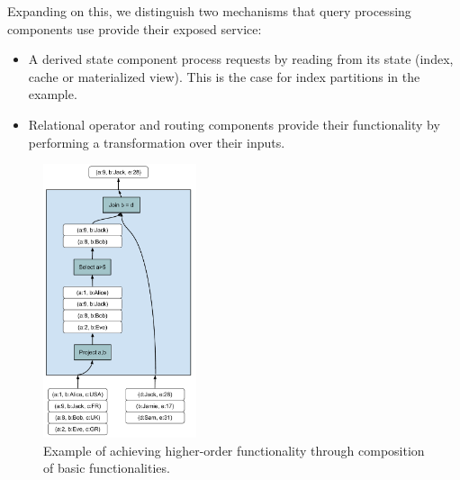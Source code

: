 Expanding on this, we distinguish two mechanisms that query processing components use provide their exposed service:
\begin{itemize}
  \item A derived state component process requests by reading from its state (index, cache or materialized view).
  This is the case for index partitions in the example.

  \item Relational operator and routing components provide their functionality by performing a transformation over their inputs.
\end{itemize}




\begin{figure}[H]
  \centering
    \includegraphics[width=0.4\textwidth]{./figures/design_pattern/observations_composition.pdf}
    \caption{Example of achieving higher-order functionality through composition of basic functionalities.}
    \label{fig:observations_composition}
\end{figure}

